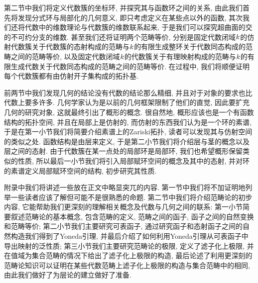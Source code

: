 第二节中我们将定义代数簇的坐标环, 并探究其与函数环之间的关系, 由此我们首先将发现分式环与局部化的几何意义, 即只考虑定义在某些点以外的函数, 其次我们还将代数中的维数理论与代数簇的维数联系起来, 于是我们可以探究超曲面的交的不可约分支的维数. 甚至我们还将证明两个范畴等价, 分别是固定代数闭域$k$的仿射代数簇关于代数簇的态射构成的范畴与$k$的有限生成整环关于代数同态构成的范畴之间的范畴等价, 以及固定代数闭域$k$的代数簇关于有理映射构成的范畴与$k$的有限生成代数关于代数同态构成的范畴之间的范畴等价. 在过程中, 我们将顺便证明每个代数簇都有由仿射开子集构成的拓扑基.

前两节中我们发现几何的结论没有代数的结论那么精细, 并且对于对象的要求也比代数上要多许多. 几何学家认为是以前的几何框架限制了他们的直觉, 因此要扩充几何的研究对象, 这就最终引出了概形的概念. 很自然地, 概形应该也是一个有函数结构的拓扑空间, 并且在局部上是仿射的, 而仿射的东西我们认为是一个环的素谱, 于是在第一小节我们将简要介绍素谱上的Zariski拓扑, 读者可以发现其与仿射空间的类似之处. 函数结构是由层来定义, 于是第二小节我们将介绍层与茎的概念以及层之间的态射. 由于代数簇在某一点处的局部环是局部环, 我们也希望概形保留类似的性质, 所以最后一小节我们将引入局部赋环空间的概念及其中的态射, 并对环的素谱定义局部赋环空间的结构, 初步研究其性质.

\bigskip

附录中我们将讲述一些放在正文中略显突兀的内容. 第一节中我们将不加证明地列举一些读者应该了解但可能不是很熟悉的命题. 第二节中我们将介绍范畴论的初步内容, 它能帮助我们更深刻的理解相关概念及代数与几何之间的联系: 第一小节简要叙述范畴论的基本概念, 包含范畴的定义, 范畴之间的函子, 函子之间的自然变换和范畴等价; 第二小节我们主要研究可表函子, 通过研究函子和态射函子之间的自然构造我们得到了Yoneda引理, 并最后介绍了如何利用Yoneda引理从可表函子中导出映射的泛性质; 第三小节我们主要研究范畴论的极限, 定义了滤子化上极限, 并在值域为集合范畴的情况下给出了滤子化上极限的构造, 最后论述了利用更深刻的范畴论知识可以证明在某些代数范畴上滤子化上极限的构造与集合范畴中的相同, 由此我们做好了为层论的建立做好了准备.




